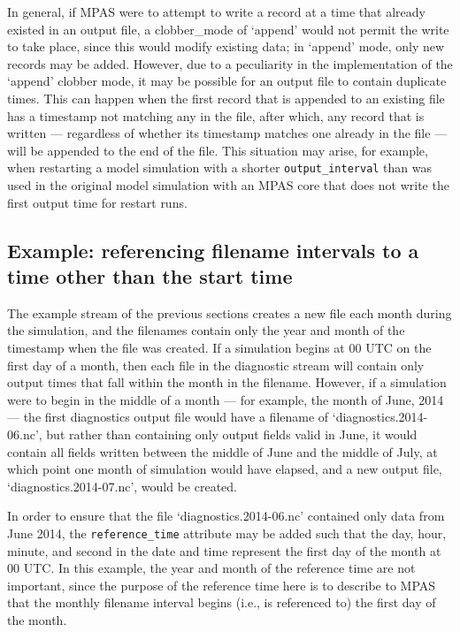 In general, if MPAS were to attempt to write a record at a time that already existed in an output file, a clobber\_mode 
of `append' would not permit the write to take place, since this would modify existing data; in `append' mode, only new
records may be added. However, due to a peculiarity in the implementation of the `append' clobber mode, it may be 
possible for an output file to contain duplicate times. This can happen when the first record that is appended to 
an existing file has a timestamp not matching any in the file, after which, any record that is written --- regardless of 
whether its timestamp matches one already in the file --- will be appended to the end of the file. This situation may arise, 
for example, when restarting a model simulation with a shorter {\tt output\_interval} than was used in the original model simulation 
with an MPAS core that does not write the first output time for restart runs.

\subsection{Example: referencing filename intervals to a time other than the start time}
\label{sec:reference_time_example}

The example stream of the previous sections creates a new file each month during the simulation, and the filenames
contain only the year and month of the timestamp when the file was created. If a simulation begins at 00 UTC on the
first day of a month, then each file in the diagnostic stream will contain only output times that fall within the month
in the filename. However, if a simulation were to begin in the middle of a month --- for example, the month of June, 2014 --- 
the first diagnostics output file would have a filename of `diagnostics.2014-06.nc', but rather than containing only output
fields valid in June, it would contain all fields written between the middle of June and the middle of July, at which point
one month of simulation would have elapsed, and a new output file, `diagnostics.2014-07.nc', would be created.

In order to ensure that the file `diagnostics.2014-06.nc' contained only data from June 2014, the {\tt reference\_time}
attribute may be added such that the day, hour, minute, and second in the date and time represent the first day of the month
at 00 UTC. In this example, the year and month of the reference time are not important, since the purpose of the reference time
here is to describe to MPAS that the monthly filename interval begins (i.e., is referenced to) the first day of the month.

